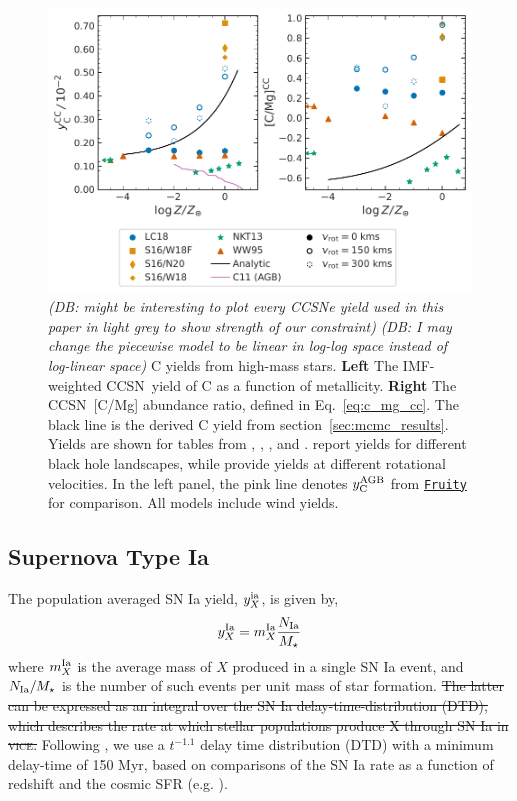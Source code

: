 \documentclass[fleqn,
usenatbib]{mnras}
\newcommand{\VICE}{\textsc{vice}}
\newcommand{\fruity}{\texttt{\hyperlink{fruity}{Fruity}}}
\newcommand{\cc}{CCSN}
\newcommand{\Ycagb}{{y_{\rm C}^{\rm AGB}}}
\newcommand{\dbstrike}[1]{{\color{Thistle} \sout{#1} }}
\newcommand{\dbnote}[1]{ {\color{Thistle} \textit{\small (DB: #1)}} }
\begin{document}
\begin{figure}
    \centering
    \includegraphics{cc_yields.pdf}
    \caption[]{
    \dbnote{might be interesting to plot every CCSNe yield used in this paper in light grey to show strength of our constraint}
    \dbnote{I may change the piecewise model to be linear in log-log space instead of log-linear space}
        C yields from high-mass stars.
        \textbf{Left} The IMF-weighted \cc\ yield of C as a function of metallicity.
        \textbf{Right} The \cc\ [C/Mg] abundance ratio, defined in Eq.~\ref{eq:c_mg_cc}. The black line is the derived C yield from section~\ref{sec:mcmc_results}. Yields are shown for tables from 
    \citet[red triangles]{WW95}, \citet[orange square and diamond]{sukhbold+16}, 
    \citet[green stars]{NKT13}, and \citet[blue circles]{LC18}. \citet{sukhbold+16} report yields for different black hole landscapes, while \citet{LC18} provide yields at different rotational velocities.
    In the left panel, the pink line denotes $\Ycagb$ from \fruity{} for comparison. All models include wind yields. 
}
    \label{fig:y_cc}
\end{figure}


\subsection{Supernova Type Ia}
The population averaged SN Ia yield, $y_{X}^{\rm ia}$, is given by,
\begin{equation}
    y_{X}^{\rm Ia} = m_{X}^{\rm Ia} \frac{N_{\rm Ia}}{M_\star}
\end{equation}
where $m_{X}^{\rm Ia}$ is the average mass of $X$ produced in a single SN Ia event, and $N_{\rm Ia} / M_\star$ is the number of such events per unit mass of star formation. \dbstrike{The latter can be expressed as an integral over the SN Ia delay-time-distribution (DTD), which describes the rate at which stellar populations produce X through SN Ia in \VICE.} Following \citet{james+23}, we use a $t^{-1.1}$  delay time distribution (DTD) with a minimum delay-time of 150 Myr, based on comparisons of the SN Ia rate as a function of redshift and the cosmic SFR (e.g. \citealt{maoz+12}). 
\end{document}
